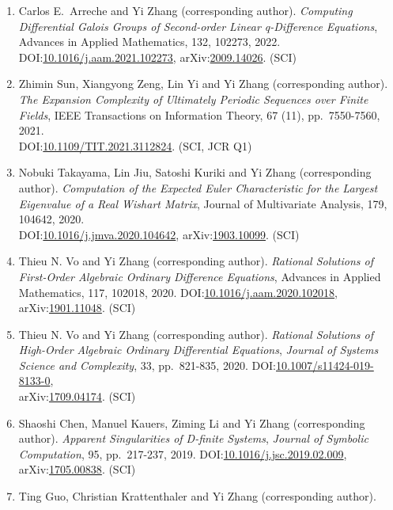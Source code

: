 \documentclass[a4paper,12pt]{article}
\begin{document}
\begin{enumerate}
\item Carlos E.\ Arreche and Yi Zhang (corresponding author). 
{\em Computing Differential Galois Groups of Second-order Linear q-Difference Equations}, Advances in Applied Mathematics, 132, 102273, 2022. 
DOI:\href{https://doi.org/10.1016/j.aam.2021.102273}{10.1016/j.aam.2021.102273}, 
arXiv:\href{https://arxiv.org/abs/2009.14026}{2009.14026}. (SCI)
\item Zhimin Sun,  Xiangyong Zeng, Lin Yi and Yi Zhang (corresponding author). 
{\em The Expansion Complexity of Ultimately Periodic Sequences over Finite Fields},  IEEE Transactions on Information Theory, 67 (11), pp.\ 7550-7560, 2021. \\ 
DOI:\href{https://doi.org/10.1109/TIT.2021.3112824}{10.1109/TIT.2021.3112824}. (SCI, JCR Q1)
 \item Nobuki Takayama, Lin Jiu, Satoshi Kuriki and Yi Zhang (corresponding author). 
 {\em Computation of the Expected Euler Characteristic for the Largest Eigenvalue of a Real Wishart Matrix}, Journal of Multivariate Analysis, 179, 104642, 2020. \\
 DOI:\href{https://doi.org/10.1016/j.jmva.2020.104642}{10.1016/j.jmva.2020.104642}, 
 arXiv:\href{http://arxiv.org/abs/1903.10099}{1903.10099}. (SCI)
 \item Thieu N. Vo and Yi Zhang (corresponding author). 
{\em Rational Solutions of First-Order Algebraic Ordinary Difference Equations},  Advances in Applied Mathematics, 117, 102018, 2020. 
DOI:\href{https://doi.org/10.1016/j.aam.2020.102018}{10.1016/j.aam.2020.102018},
arXiv:\href{http://arxiv.org/abs/1901.11048}{1901.11048}. (SCI)
 \item Thieu N. Vo and Yi Zhang (corresponding author). {\em Rational Solutions of High-Order Algebraic Ordinary Differential Equations},  {\em Journal of Systems Science and Complexity}, 33, pp.\ 821-835, 2020. DOI:\href{https://link.springer.com/article/10.1007/s11424-019-8133-0}{10.1007/s11424-019-8133-0}, \\
 arXiv:\href{https://arxiv.org/abs/1709.04174}{1709.04174}. (SCI)
  \item Shaoshi Chen, Manuel Kauers, Ziming Li and Yi Zhang (corresponding author). {\em Apparent Singularities of D-finite Systems}, 
 {\em  Journal of Symbolic Computation},  95, pp.\ 217-237, 2019. DOI:\href{https://doi.org/10.1016/j.jsc.2019.02.009}{10.1016/j.jsc.2019.02.009}, arXiv:\href{http://arxiv.org/abs/1705.00838}{1705.00838}. (SCI)
\item Ting Guo, Christian Krattenthaler and Yi Zhang (corresponding author).

\end{enumerate}
\end{document}
